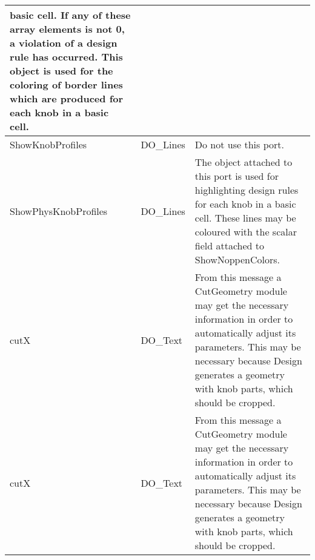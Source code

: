\begin{htmlonly}
\begin{longtable}{|p{3.5cm}|p{4cm}|p{7cm}|}
                   basic cell. If any of these array elements is
                   not 0, a violation of a design rule has occurred.
                   This object is used for the coloring of border
                   lines which are produced for each knob in a basic cell.\\
\hline
	\textcolor{required}{ShowKnobProfiles} & DO\_Lines & 
                   Do not use this port.\\
\hline
	\textcolor{required}{ShowPhysKnobProfiles} & DO\_Lines & 
                   The object attached to this port is used
                   for highlighting design rules for each
                   knob in a basic cell. These lines may be coloured
                   with the scalar field attached to ShowNoppenColors.\\
\hline
	\textcolor{required}{cutX} & DO\_Text & 
                   From this message a CutGeometry module
                   may get the necessary information in order
                   to automatically adjust its parameters. This
                   may be necessary because Design generates a
                   geometry with knob parts, which should be
                   cropped.\\
\hline
	\textcolor{required}{cutX} & DO\_Text & 
                   From this message a CutGeometry module
                   may get the necessary information in order
                   to automatically adjust its parameters. This
                   may be necessary because Design generates a
                   geometry with knob parts, which should be
                   cropped.\\
                    

\hline
\end{longtable}



\end{htmlonly}
